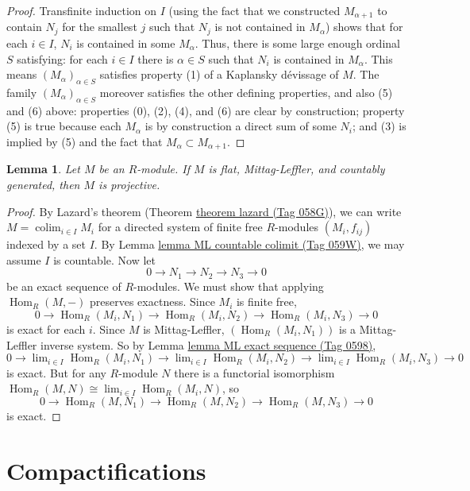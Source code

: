 \documentclass{amsart}
\theoremstyle{plain}
\newtheorem{lemma}[subsection]{Lemma}
\theoremstyle{definition}
\theoremstyle{remark}
\numberwithin{equation}{subsection}
\def\lim{\mathop{\mathrm{lim}}\nolimits}
\def\colim{\mathop{\mathrm{colim}}\nolimits}
\def\Hom{\mathop{\mathrm{Hom}}\nolimits}
\begin{document}
\begin{proof}
\medskip\noindent
Transfinite induction on $I$ (using the fact that we constructed
$M_{\alpha + 1}$
to contain $N_j$ for the smallest $j$ such that $N_j$ is not contained in
$M_{\alpha}$) shows that for each $i \in I$, $N_i$ is contained in some
$M_{\alpha}$.  Thus, there is some large enough ordinal $S$ satisfying: for
each $i \in I$ there is $\alpha \in S$ such that $N_i$ is contained in
$M_{\alpha}$.  This means $(M_{\alpha})_{\alpha \in S}$ satisfies property (1)
of a Kaplansky d\'evissage of $M$.  The family $(M_{\alpha})_{\alpha \in S}$
moreover satisfies the other defining properties, and also (5) and (6) above:
properties (0), (2), (4), and (6) are clear by construction;  property (5) is
true because each $M_{\alpha}$ is by construction a direct sum of some $N_i$;
and (3) is implied by (5) and the fact that $M_{\alpha} \subset M_{\alpha + 1}$.
\end{proof}


\begin{lemma}
\label{algebra-lemma-countgen-projective}
Let $M$ be an $R$-module.  If $M$ is flat, Mittag-Leffler, and countably
generated, then $M$ is projective.
\end{lemma}

\begin{proof}
By Lazard's theorem (Theorem \href{https://stacks.math.columbia.edu/tag/058G}{theorem lazard (Tag 058G)}), we can write $M =
\colim_{i
\in I} M_i$ for a directed system of finite free $R$-modules $(M_i, f_{ij})$
indexed by a set $I$.  By Lemma \href{https://stacks.math.columbia.edu/tag/059W}{lemma ML countable colimit (Tag 059W)}, we may assume
$I$ is countable.  Now let
$$
0 \to N_1 \to N_2 \to N_3 \to 0
$$
be an exact sequence of $R$-modules.  We must show that applying
$\Hom_R(M, -)$
preserves exactness.  Since $M_i$ is finite free,
$$
0 \to \Hom_R(M_i, N_1) \to \Hom_R(M_i, N_2) \to
\Hom_R(M_i, N_3) \to 0
$$
is exact for each $i$.  Since $M$ is Mittag-Leffler, $(\Hom_R(M_i,
N_{1}))$ is
a Mittag-Leffler inverse system.  So by Lemma \href{https://stacks.math.columbia.edu/tag/0598}{lemma ML exact sequence (Tag 0598)},
$$
0 \to \lim_{i \in I} \Hom_R(M_i, N_1) \to
\lim_{i \in I} \Hom_R(M_i, N_2) \to
\lim_{i \in I} \Hom_R(M_i, N_3) \to 0
$$
is exact.  But for any $R$-module $N$ there is a functorial isomorphism
$\Hom_R(M, N) \cong \lim_{i \in I} \Hom_R(M_i, N)$, so
$$
0 \to \Hom_R(M, N_1) \to \Hom_R(M, N_2) \to
\Hom_R(M, N_3) \to 0
$$
is exact.
\end{proof}


\section{Compactifications}
\label{section-compactify}
\end{document}
